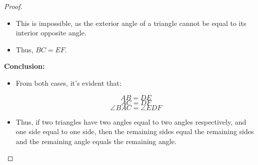 \begin{proof}
\begin{itemize}
  \item This is impossible, as the exterior angle of a triangle cannot be equal to its interior opposite angle.
  
  \item Thus, $BC = EF$.

\end{itemize}

\textbf{Conclusion:}
\begin{itemize}

  \item From both cases, it's evident that:

    \[AB = DE\]
    \[AC = DF\]
    \[\angle BAC = \angle EDF\]
  
  \item Thus, if two triangles have two angles equal to two angles respectively, and one side equal to one side, then the remaining sides equal the remaining sides and the remaining angle equals the remaining angle.
  
\end{itemize}

\end{proof}

\clearpage
			